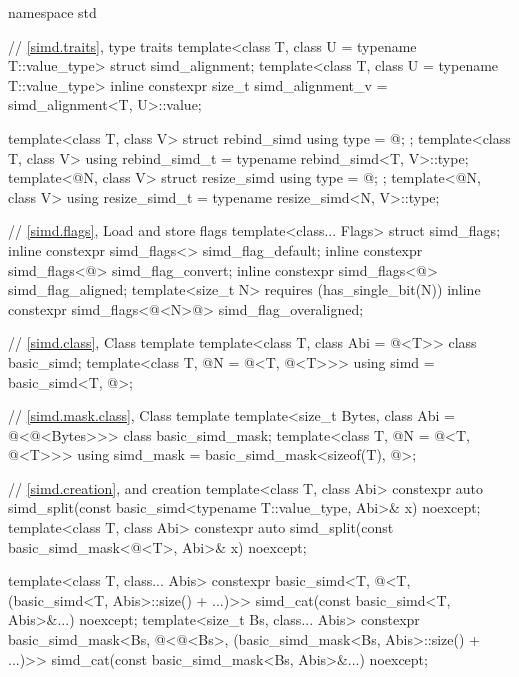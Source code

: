 \begin{codeblock}
namespace std {
  // \ref{simd.traits},  type traits
  template<class T, class U = typename T::value_type> struct simd_alignment;
  template<class T, class U = typename T::value_type>
    inline constexpr size_t simd_alignment_v = simd_alignment<T, U>::value;

  template<class T, class V> struct rebind_simd { using type = @\seebelow@; };
  template<class T, class V> using rebind_simd_t = typename rebind_simd<T, V>::type;
  template<@\simdsizetype@ N, class V> struct resize_simd { using type = @\seebelow@; };
  template<@\simdsizetype@ N, class V> using resize_simd_t = typename resize_simd<N, V>::type;

  // \ref{simd.flags}, Load and store flags
  template<class... Flags> struct simd_flags;
  inline constexpr simd_flags<> simd_flag_default{};
  inline constexpr simd_flags<@\convertflag@> simd_flag_convert{};
  inline constexpr simd_flags<@\alignedflag@> simd_flag_aligned{};
  template<size_t N> requires (has_single_bit(N))
    inline constexpr simd_flags<@\overalignedflag<N>@> simd_flag_overaligned{};

  // \ref{simd.class}, Class template 
  template<class T, class Abi = @\nativeabi@<T>> class basic_simd;
  template<class T, @\simdsizetype@ N = @\simdsizev@<T, @\nativeabi@<T>>>
    using simd = basic_simd<T, @>;

  // \ref{simd.mask.class}, Class template 
  template<size_t Bytes, class Abi = @\nativeabi@<@\integerfrom@<Bytes>>> class basic_simd_mask;
  template<class T, @\simdsizetype@ N = @\simdsizev@<T, @\nativeabi@<T>>>
    using simd_mask = basic_simd_mask<sizeof(T), @>;

  // \ref{simd.creation},  and  creation
  template<class T, class Abi>
    constexpr auto
      simd_split(const basic_simd<typename T::value_type, Abi>& x) noexcept;
  template<class T, class Abi>
    constexpr auto
      simd_split(const basic_simd_mask<@\maskelementsize@<T>, Abi>& x) noexcept;

  template<class T, class... Abis>
    constexpr basic_simd<T, @\deducet@<T, (basic_simd<T, Abis>::size() + ...)>>
      simd_cat(const basic_simd<T, Abis>&...) noexcept;
  template<size_t Bs, class... Abis>
    constexpr basic_simd_mask<Bs, @\deducet@<@\integerfrom@<Bs>,
                              (basic_simd_mask<Bs, Abis>::size() + ...)>>
      simd_cat(const basic_simd_mask<Bs, Abis>&...) noexcept;

}
\end{codeblock}
